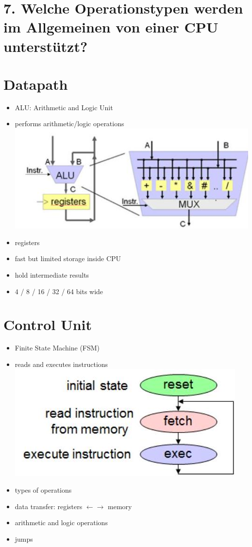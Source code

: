 \documentclass[10pt]{article}
\begin{document}
\section*{7. Welche Operationstypen werden im Allgemeinen von einer CPU unterstützt?}
\section*{Datapath}
\begin{itemize}
  \item ALU: Arithmetic and Logic Unit
  \item performs arithmetic/logic operations\\
\includegraphics[width=\linewidth]{images/2025_01_02_f240dc33b50f25226887g-3(1)}
  \item registers
  \item fast but limited storage inside CPU
  \item hold intermediate results
  \item 4 / 8 / 16 / 32 / 64 bits wide
\end{itemize}

\section*{Control Unit}
\begin{itemize}
  \item Finite State Machine (FSM)
  \item reads and executes instructions\\
\includegraphics[width=\linewidth]{images/2025_01_02_f240dc33b50f25226887g-3}
  \item types of operations
  \item data transfer: registers $\leftarrow \rightarrow$ memory
  \item arithmetic and logic operations
  \item jumps
\end{itemize}
\end{document}
